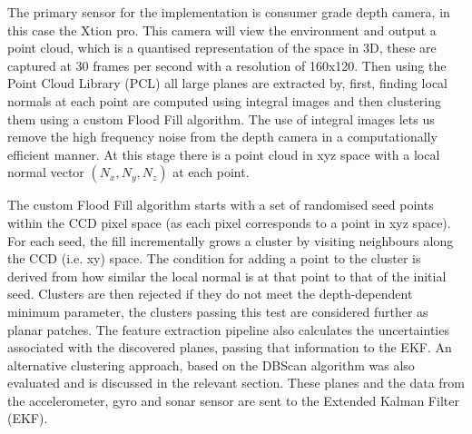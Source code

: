 \documentclass[]{article}
\begin{document}
{%

The primary sensor for the implementation is consumer grade depth camera, in this case the Xtion pro. This camera will view the environment and output a point cloud, which is a quantised representation of the space in 3D, these are captured at 30 frames per second with a resolution of 160x120. Then using the Point Cloud Library (PCL) all large planes are extracted by, first, finding local normals at each point are computed using integral images \cite{Holz2011} and then clustering them using a custom Flood Fill algorithm.  The use of integral images lets us remove the high frequency noise from the depth camera in a computationally efficient manner. At this stage there is a point cloud in xyz space with a local normal vector $(N_x, N_y, N_z)$ at each point. 

The custom Flood Fill algorithm starts with a set of randomised seed points within the CCD pixel space (as each pixel corresponds to a point in xyz space). For each seed, the fill incrementally grows a cluster by visiting neighbours along the CCD (i.e. xy) space. The condition for adding a point to the cluster is derived from how similar the local normal is at that point to that of the initial seed. Clusters are then rejected if they do not meet the depth-dependent minimum parameter, the clusters passing this test are considered further as planar patches. The feature extraction pipeline also calculates the uncertainties associated with the discovered planes, passing that information to the EKF. An alternative clustering approach, based on the DBScan algorithm was also evaluated and is discussed in the relevant section. These planes and the data from the accelerometer, gyro and sonar sensor are sent to the Extended Kalman Filter (EKF). 


}
\end{document}
